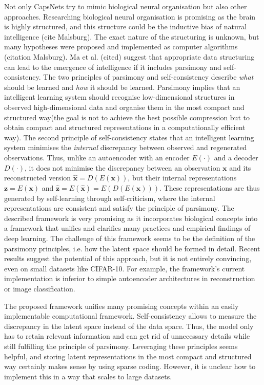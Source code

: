 Not only CapsNets try to mimic biological neural organisation but also other approaches. Researching biological neural organisation is promising as the brain is highly structured, and this structure could be the inductive bias of natural intelligence (cite Malsburg). The exact nature of the structuring is unknown, but many hypotheses were proposed and implemented as computer algorithms (citation Malsburg). Ma et al. (cited) suggest that appropriate data structuring can lead to the emergence of intelligence if it includes parsimony and self-consistency. The two principles of parsimony and self-consistency describe \emph{what} should be learned and \emph{how} it should be learned. Parsimony implies that an intelligent learning system should recognise low-dimensional structures in observed high-dimensional data and organise them in the most compact and structured way\sidenote(the goal is not to achieve the best possible compression but to obtain compact and structured representations in a computationally efficient way). The second principle of self-consistency states that an intelligent learning system minimises the \emph{internal} discrepancy between observed and regenerated observations. Thus, unlike an autoencoder with an encoder $E(\cdot)$ and a decoder $D(\cdot)$, it does not minimise the discrepancy between an observation $\boldsymbol{x}$ and its reconstructed version $\boldsymbol{\hat{x}} = D(E(\boldsymbol{x}))$, but their internal representations $\boldsymbol{z} = E(\boldsymbol{x})$ and $\boldsymbol{\hat{z}} = E(\boldsymbol{\hat{x}}) = E(D(E(\boldsymbol{x})))$. These representations are thus generated by self-learning through self-criticism, where the internal representations are consistent and satisfy the principle of parsimony. The described framework is very promising as it incorporates biological concepts into a framework that unifies and clarifies many practices and empirical findings of deep learning. The challenge of this framework seems to be the definition of the parsimony principles, i.e. how the latent space should be formed in detail. Recent results suggest the potential of this approach, but it is not entirely convincing, even on small datasets like CIFAR-10. For example, the framework's current implementation is inferior to simple autoencoder architectures in reconstruction or image classification.

The proposed framework unifies many promising concepts within an easily implementable computational framework. Self-consistency allows to measure the discrepancy in the latent space instead of the data space. Thus, the model only has to retain relevant information and can get rid of unnecessary details while still fulfilling the principle of parsimony. Leveraging these principles seems helpful, and storing latent representations in the most compact and structured way certainly makes sense by using sparse coding. However, it is unclear how to implement this in a way that scales to large datasets. 

